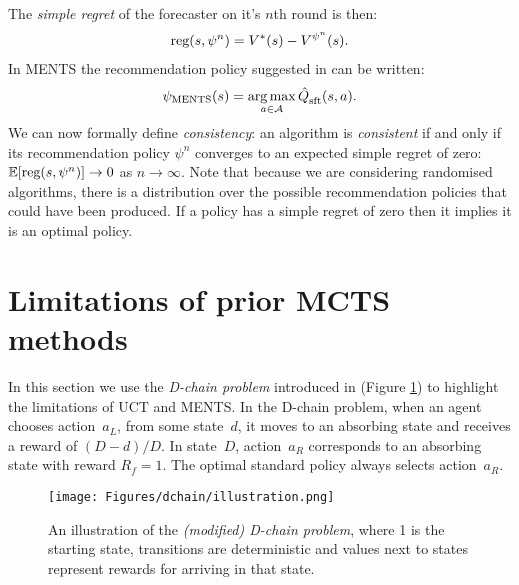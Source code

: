 \documentclass{article}
\newcommand{\bb}[1]{\mathbb{#1}}
\newcommand{\cl}[1]{\mathcal{#1}}
\newcommand{\Qst}[3]{\hat{Q}^{#3}_{\textnormal{sft}}(#1,#2)}
\newcommand{\reg}{\textnormal{reg}}
\DeclareMathOperator*{\argmax}{arg\,max}
\theoremstyle{plain}
\begin{document}
        The \textit{simple regret} of the forecaster on it's $n$th round is then:
        \begin{align}
            \reg(s,\psi^n) = V^*(s)-V^{\psi^n}(s).
        \end{align}
        In MENTS the %
        recommendation policy suggested in \cite{xiao2019maximum} can be written:
        \begin{align}
            \psi_{\text{MENTS}}(s)=\argmax_{a\in\cl{A}}\Qst{s}{a}{}. %
        \end{align}
        We can now formally define \textit{consistency}: an algorithm is \textit{consistent} if and only if its recommendation policy $\psi^n$ converges to an expected simple regret of zero: $\bb{E}[\reg(s,\psi^n)]\rightarrow 0$ as $n\rightarrow \infty$. Note that because we are considering randomised algorithms, there is a distribution over the possible recommendation policies that could have been produced. If a policy has a simple regret of zero then it implies it is an optimal policy.
        





\section{Limitations of prior MCTS methods} \label{sec:limitations}
    In this section we use the \textit{D-chain problem} introduced in \cite{coquelin2007_uct} (Figure \ref{fig:dchain_illustration}) to highlight the limitations of UCT and MENTS. In the D-chain problem, when an agent chooses action~$a_L$, from some state~$d$, it moves to an absorbing state and receives a reward of $(D-d)/D$. In state~$D$, action~$a_R$ corresponds to an absorbing state with reward $R_f = 1$. The optimal standard policy always selects action~$a_R$. %
    
    \begin{figure}
        \centering
        \texttt{[image: Figures/dchain/illustration.png]}
        \caption{An illustration of the \textit{(modified) D-chain problem}, where 1 is the starting state, %
            transitions are deterministic and values next to states represent %
            rewards for arriving in that state.}
        \label{fig:dchain_illustration}
    \end{figure}
	
\end{document}
